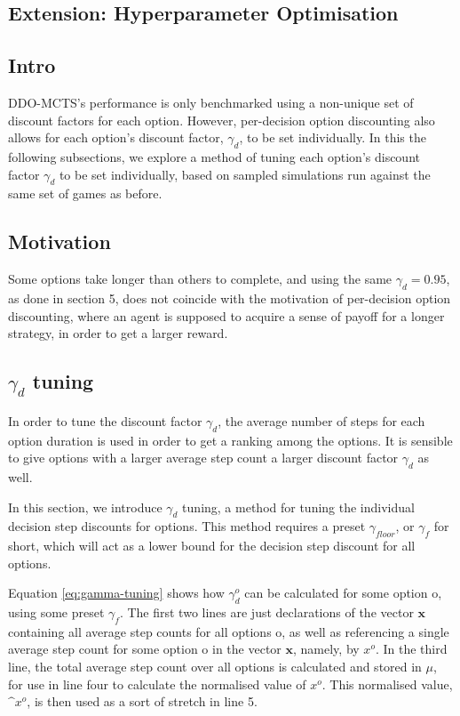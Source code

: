 \documentclass[12pt,a4paper]{article}
\begin{document}
\begin{multicols}{2}
\section{Extension: Hyperparameter Optimisation}
\subsection{Intro}
DDO-MCTS's performance is only benchmarked using a non-unique set of discount factors for each option. However, per-decision option discounting also allows for each option's discount factor, $\gamma_{d}$, to be set individually. In this the following subsections, we explore a method of tuning each option's discount factor $\gamma_{d}$ to be set individually, based on sampled simulations run against the same set of games as before.

\subsection{Motivation}
Some options take longer than others to complete, and using the same $\gamma_{d} = 0.95$, as done in section 5, does not coincide with the motivation of per-decision option discounting, where an agent is supposed to acquire a sense of payoff for a longer strategy, in order to get a larger reward.

\subsection{$\gamma_{d}$ tuning}
In order to tune the discount factor $\gamma_{d}$, the average number of steps for each option duration is used in order to get a ranking among the options. It is sensible to give options with a larger average step count a larger discount factor $\gamma_{d}$ as well.

In this section, we introduce $\gamma_d$ tuning, a method for tuning the individual decision step discounts for options. This method requires a preset $\gamma_{floor}$, or $\gamma_{f}$ for short, which will act as a lower bound for the decision step discount for all options.

Equation \eqref{eq:gamma-tuning} shows how $\gamma^o_{d}$ can be calculated for some option o, using some preset $\gamma_{f}$. The first two lines are just declarations of the vector $\mathbf{x}$ containing all average step counts for all options o, as well as referencing a single average step count for some option o in the vector $\mathbf{x}$, namely, by $x^o$. In the third line, the total average step count over all options is calculated and stored in $\mu$, for use in line four to calculate the normalised value of $x^o$. This normalised value, $\^{x}^o$, is then used as a sort of stretch in line 5.


\end{multicols}
\end{document}
